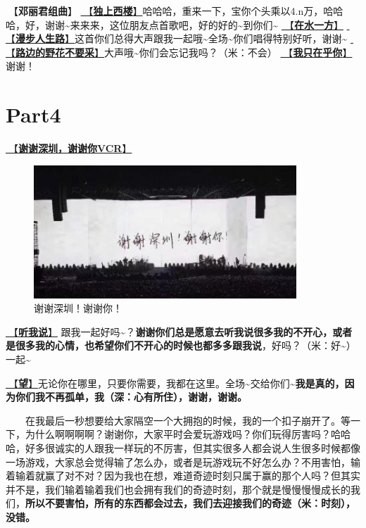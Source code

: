 \documentclass[]{ctexbook}
\begin{document}
🎵【\textbf{邓丽君组曲}】
\hyperref[one-in-the-building]{🎵【\textbf{独上西楼}】}哈哈哈，重来一下，宝你个头乘以4.n万，哈哈哈，好，谢谢\textasciitilde 来来来，这位朋友点首歌吧，好的好的\textasciitilde 到你们\textasciitilde{}
\hyperref[on-the-water-side]{🎵【\textbf{在水一方}】}
\hyperref[walk-the-road-of-life]{🎵【\textbf{漫步人生路}】}这首你们总得大声跟我一起哦\textasciitilde 全场\textasciitilde 你们唱得特别好听，谢谢\textasciitilde{}
\hyperref[only-with-me]{🎵【\textbf{路边的野花不要采}】}大声哦\textasciitilde 你们会忘记我吗？（米：不会）
\hyperref[only-you]{🎵【\textbf{我只在乎你}】}谢谢！

\section{Part4}\label{shenzhen-20240601-part4}

\hyperref[thank-you-vcr]{🎥【\textbf{谢谢深圳，谢谢你VCR}】}

\begin{figure}

{\centering \includegraphics[width=280pt]{img/shenzhen20240601/thank-shenzhen} 

}

\caption{谢谢深圳！谢谢你！}\label{fig:unnamed-chunk-41}
\end{figure}

\hyperref[listen-to-me]{🎵【\textbf{听我说}】} 跟我一起好吗\textasciitilde？\textbf{谢谢你们总是愿意去听我说很多我的不开心，或者是很多我的心情，也希望你们不开心的时候也都多多跟我说}，好吗？（米：好\textasciitilde）一起\textasciitilde{}

\hyperref[hope]{🎵【\textbf{望}】}无论你在哪里，只要你需要，我都在这里。全场\textasciitilde 交给你们\textasciitilde{}\textbf{我是真的，因为你们我不再孤单，我（深：心有所住），谢谢，谢谢。}

  在我最后一秒想要给大家隔空一个大拥抱的时候，我的一个扣子崩开了。等一下，为什么啊啊啊啊？谢谢你，大家平时会爱玩游戏吗？你们玩得厉害吗？哈哈哈，好多很诚实的人跟我一样玩的不厉害，但其实很多人都会说人生很多时候都像一场游戏，大家总会觉得输了怎么办，或者是玩游戏玩不好怎么办？不用害怕，输着输着就赢了对不对？因为我也在想，难道奇迹时刻只属于赢的那个人吗？但其实并不是，我们输着输着我们也会拥有我们的奇迹时刻，那个就是慢慢慢慢成长的我们，\textbf{所以不要害怕，所有的东西都会过去，我们去迎接我们的奇迹（米：时刻），没错。}
\end{document}
